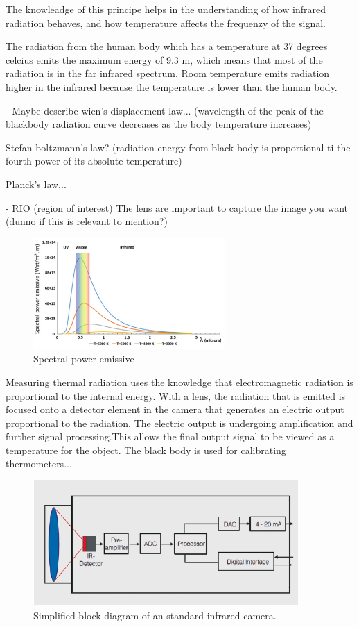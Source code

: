 The knowleadge of this principe helps in the understanding of how infrared radiation behaves, and how temperature affects the frequenzy of the signal. 

The radiation from the human body which has a temperature at 37 degrees celcius emits the maximum energy of 9.3 \mu m, which means that most of the radiation is in the far infrared spectrum. Room temperature emits radiation higher in the infrared because the temperature is lower than the human body.

- Maybe describe wien's displacement law... (wavelength of the peak of the blackbody radiation curve decreases as the body temperature increases)

Stefan boltzmann's law? (radiation energy from black body is proportional ti the fourth power of its absolute temperature)

Planck's law...

- RIO (region of interest)
The lens are important to capture the image you want (dunno if this is relevant to mention?)

\begin{figure}[H]
	\centering	\includegraphics[width=0.65\textwidth]{figures/Spectral_power_emissive}
	\caption{Spectral power emissive}
	\label{fig:Spectral}
\end{figure} \vspace{-.3cm}

Measuring thermal radiation uses the knowledge that electromagnetic radiation is proportional to the internal energy. With a lens, the radiation that is emitted is focused onto a detector element in the camera that generates an electric output proportional to the radiation. The electric output is undergoing amplification and further signal processing.This allows the final output signal to be viewed as a temperature for the object. \cite{optris2009}
The black body is used for calibrating thermometers...

\begin{figure}[H]                                         
	\includegraphics[width=.55\textwidth]{figures/IR_cam}  
	\caption{Simplified block diagram of an standard infrared camera.\cite{optris2009}}
	\label{fig:em_spectrum}  
\end{figure} 

